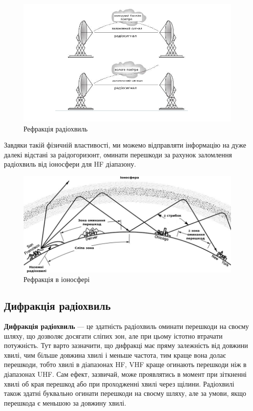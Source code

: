 \documentclass{article}
\begin{document}
\begin{figure}[h!]
	\centering
	\includegraphics[width=0.8\linewidth]{images/refraction.png}
	\caption{\label{fig:refraction}Рефракція радіохвиль}
\end{figure}


Завдяки такій фізичній властивості, ми можемо відправляти інформацію на дуже далекі відстані за раідогоризонт, оминати перешкоди за рахунок заломлення радіохвиль від іоносфери для HF діапазону.

\begin{figure}[h!]
	\centering
	\includegraphics[width=0.8\linewidth]{images/refraction2.png}
	\caption{\label{fig:refraction2}Рефракція в іоносфері}
\end{figure}



\subsection{Дифракція радіохвиль}

\textbf{Дифракція радіохвиль} --- це здатність радіохвиль оминати перешкоди на своєму шляху, що дозволяє досягати сліпих зон, але при цьому істотно втрачати потужність. Тут варто зазначити, що дифракці має пряму залежність від довжини хвилі, чим більше довжина хвилі і меньше частота, тим краще вона долає перешкоди, тобто хвилі в діапазонах HF, VHF краще огинають перешкоди ніж в діапазонах UHF. Сам ефект, зазвичай, може проявлятись в момент при зіткненні хвилі об края перешкод або при проходженні хвилі через щілини. Радіохвилі також здатні буквально огинати перешкоди на своєму шляху, але за умови, якщо перешкода є меньшою за довжину хвилі.
\end{document}
